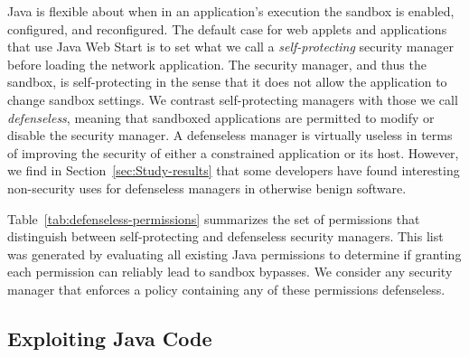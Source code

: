 \documentclass{sig-alternate}
\begin{document}
Java is flexible about when in an application's execution the sandbox
is enabled, configured, and reconfigured. The default case for web applets and applications
that use Java Web Start is to set what we call a \textit{self-protecting} security
manager before loading the network application. The security
manager, and thus the sandbox, is self-protecting in the sense that
it does not allow the application to change sandbox settings. We contrast
self-protecting managers with those we call 
\textit{defenseless}, meaning that sandboxed applications are 
permitted to modify or disable the security manager.  
A defenseless manager is virtually useless in terms of improving the
security of either a constrained application or its host. However, we find
in Section~\ref{sec:Study-results} that some developers
have found interesting non-security uses for defenseless managers in otherwise
benign software.

Table~\ref{tab:defenseless-permissions} summarizes the set of permissions
that distinguish between self-protecting and defenseless security
managers. This list was generated by evaluating all existing Java permissions to determine if granting each permission can reliably lead to sandbox bypasses. We consider any security manager that enforces a policy
containing any of these permissions defenseless.

\subsection{Exploiting Java Code}
\label{sec:javaexploits}
\end{document}
